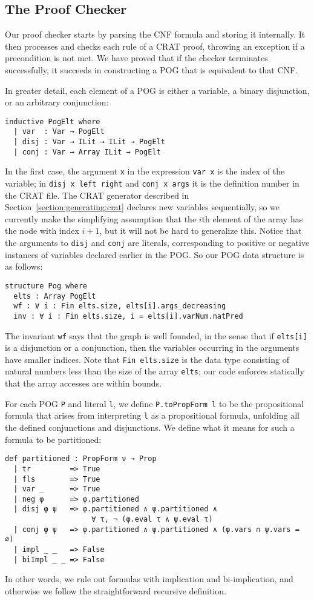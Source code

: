 \subsection{The Proof Checker}
\label{subsection:proof:checker}

Our proof checker starts by parsing the CNF formula and storing it internally.
It then processes and checks each rule of a CRAT proof, throwing an exception if
a precondition is not met. We have proved that if the checker terminates successfully,
it succeeds in constructing a POG that is equivalent to that CNF.

In greater detail, each element of a POG  is either a variable, a binary disjunction,
or an arbitrary conjunction:
\begin{lstlisting}
inductive PogElt where
  | var  : Var → PogElt
  | disj : Var → ILit → ILit → PogElt
  | conj : Var → Array ILit → PogElt
\end{lstlisting}
In the first case, the argument \lstinline{x} in the expression
\lstinline{var x} is the index
of the variable; in \lstinline{disj x left right} and \lstinline{conj x args}
it is the definition number in the CRAT file.
The CRAT generator described in Section~\ref{section:generating:crat}
declares new variables sequentially, so we currently make the simplifying assumption
that the $i$th element of the array has the node with index $i + 1$,
but it will not be hard to generalize this.
Notice that the arguments to \lstinline{disj} and \lstinline{conj} are literals,
corresponding to positive or negative instances of variables declared earlier in the POG.
So our POG data structure is as follows:
\begin{lstlisting}
structure Pog where
  elts : Array PogElt
  wf : ∀ i : Fin elts.size, elts[i].args_decreasing
  inv : ∀ i : Fin elts.size, i = elts[i].varNum.natPred
\end{lstlisting}
The invariant \lstinline{wf} says that the graph is well founded, in the
sense that if \lstinline{elts[i]} is a disjunction
or a conjunction, then the variables occurring in the arguments have smaller indices.
Note that \lstinline{Fin elts.size} is the data type consisting of natural numbers
less than the size of the array \lstinline{elts}; our code enforces statically
that the array accesses are within bounds.

For each POG \lstinline{P} and literal \lstinline{l}, we define
\lstinline{P.toPropForm l} to be the
propositional formula that arises from interpreting \lstinline{l} as a propositional
formula, unfolding all the defined conjunctions and disjunctions. We define
what it means for such a formula to be partitioned:
\begin{lstlisting}
def partitioned : PropForm ν → Prop
  | tr         => True
  | fls        => True
  | var _      => True
  | neg φ      => φ.partitioned
  | disj φ ψ   => φ.partitioned ∧ ψ.partitioned ∧
                    ∀ τ, ¬ (φ.eval τ ∧ ψ.eval τ)
  | conj φ ψ   => φ.partitioned ∧ ψ.partitioned ∧ (φ.vars ∩ ψ.vars = ∅)
  | impl _ _   => False
  | biImpl _ _ => False
\end{lstlisting}
In other words, we rule out formulas with implication and bi-implication, and otherwise
we follow the straightforward recursive definition.

